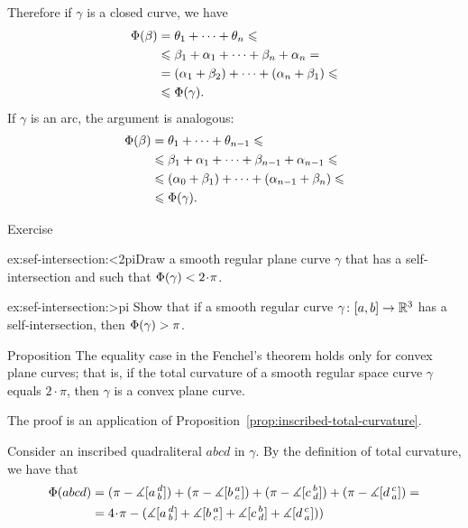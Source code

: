 Therefore if $\gamma$ is a closed curve, we have
\begin{align*}
\Phi({\beta})&=\theta_1+\dots+\theta_n\leqslant 
\\
&\leqslant\beta_1+\alpha_1+\dots+\beta_n+\alpha_n = 
\\
&=(\alpha_1+\beta_2)+\dots+(\alpha_n+\beta_1) \leqslant 
\\
&\leqslant \Phi({\gamma}).
\end{align*}
If $\gamma$ is an arc, the argument is analogous:
\begin{align*}
\Phi({\beta})&=\theta_1+\dots+\theta_{n-1}\leqslant 
\\
&\leqslant\beta_1+\alpha_1+\dots+\beta_{n-1}+\alpha_{n-1} \leqslant
\\
&\leqslant (\alpha_0+\beta_1)+\dots+(\alpha_{n-1}+\beta_n) \leqslant 
\\
&\leqslant \Phi({\gamma}).
\end{align*}
\qedsf

\begin{thm}{Exercise}\label{ex:sef-intersection}

\begin{subthm}{ex:sef-intersection:<2pi}Draw a smooth regular plane curve $\gamma$ that has a self-intersection and such that $\tc\gamma<2\cdot\pi$.
\end{subthm}

\begin{subthm}{ex:sef-intersection:>pi} Show that if a smooth regular curve $\gamma\colon[a,b]\to\mathbb{R}^3$ has a self-intersection, then $\Phi({\gamma})>\pi$.
\end{subthm}

\end{thm}

\begin{thm}{Proposition}\label{prop:fenchel=}
The equality case in the Fenchel's theorem holds only for convex plane curves;
that is, if the total curvature of a smooth regular space curve $\gamma$ equals $2\cdot\pi$, then $\gamma$ is a convex plane curve.
\end{thm}

The proof is an application of Proposition~\ref{prop:inscribed-total-curvature}.

Consider an inscribed quadraliteral $abcd$ in $\gamma$.
By the definition of total curvature, we have that
\begin{align*}
\tc{abcd}&=(\pi-
\measuredangle\hinge adb)+(\pi-
\measuredangle\hinge bac)+(\pi-
\measuredangle\hinge cbd)+(\pi-
\measuredangle\hinge dca)=
\\
&=4\cdot\pi -(
\measuredangle\hinge adb
+
\measuredangle\hinge bac
+
\measuredangle\hinge cbd
+
\measuredangle\hinge dca))
\end{align*}


